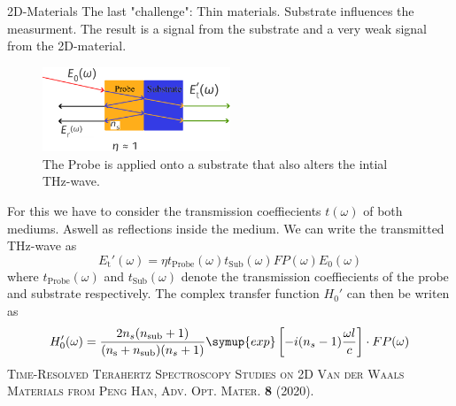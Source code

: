 \documentclass[aspectratio=1610, 9pt]{beamer}
\begin{document}
\begin{frame}{2D-Materials}
  The last "challenge": Thin materials.
  Substrate influences the measurment.
  The result is a signal from the substrate and a very weak signal from the 2D-material.
  \begin{figure}
    \includegraphics[width=0.5\textwidth]{images/2d.pdf}
    \caption{The Probe is applied onto a substrate that also alters the intial THz-wave.}
  \end{figure}
\end{frame}

\begin{frame}
  For this we have to consider the transmission coeffiecients $t(\omega)$ of both mediums.
  Aswell as reflections inside the medium.
  We can write the transmitted THz-wave as
  \begin{equation}
    E_\text{t} '(\omega) = \eta t_\text{Probe}(\omega) t_\text{Sub}(\omega)FP(\omega)E_0(\omega)
  \end{equation}
  where $t_\text{Probe}(\omega)$ and $t_\text{Sub}(\omega)$ denote the transmission coeffiecients of the probe and substrate respectively.
  The complex transfer function $H_0'$ can then be writen as 
  \begin{equation}
    H_0'(\omega) = \frac{2 n_s(n_\text{sub} + 1)}{(n_\text{s} + n_\text{sub})(n_s + 1)} \symup{exp}\left[ - i (n_s - 1) \frac{\omega l }{c}\right]\cdot FP(\omega)
  \end{equation}
  \textsc{\textcolor{tugreen}{Time-Resolved Terahertz Spectroscopy Studies on 2D Van der Waals Materials} from Peng Han, Adv. Opt. Mater. \textbf{8} (2020).}
\end{frame}
\end{document}
